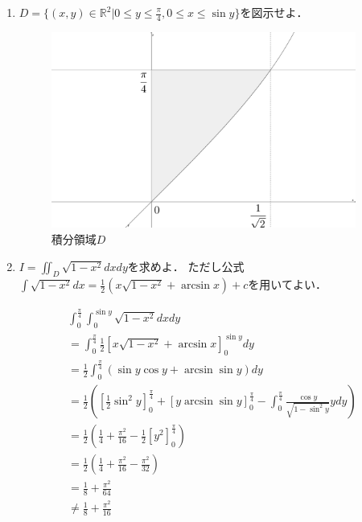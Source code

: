 \documentclass[a4paper,10pt]{jarticle}
\begin{document}
\begin{enumerate}
\item$D=\{(x,y)\in \mathbb{R}^2|0 \leq y \leq \frac{\pi}{4}, 0 \leq x \leq \sin{y}\}$を図示せよ．

\begin{figure}[H]
	\begin{center}
		\includegraphics[width=100mm,bb  = 0 0 300 200]{21.png}
	\end{center}
 	\caption{積分領域$D$}
\end{figure}

\item $I=\iint_{D} \sqrt{1-x^2} dxdy$を求めよ．
ただし公式$\int\sqrt{1-x^2}dx=\frac{1}{2}(x\sqrt{1-x^2}+\arcsin{x})+c$を用いてよい．
\begin{fleqn}[30pt] \begin{gather*}
	\int_0^{\frac{\pi}{4}} \int_{0}^{\sin{y}} \sqrt{1-x^2} dx dy\\
	=\int_0^{\frac{\pi}{4}} \frac{1}{2} \left[ x\sqrt{1-x^2} + \arcsin{x} \right]_{0}^{\sin{y}} dy\\
	=\frac{1}{2} \int_0^{\frac{\pi}{4}} ( \sin{y}\cos{y}+\arcsin{\sin{y}} ) dy\\
	=\frac{1}{2} \left( \left[ \frac{1}{2}\sin^2{y} \right]^{\frac{\pi}{4}}_0 + \left[ y \arcsin{\sin{y}} \right]^{\frac{\pi}{4}}_0 - \int_0^{\frac{\pi}{4}}\frac{\cos{y}}{\sqrt{1-\sin^2{y}}}ydy \right) \\
	=\frac{1}{2} \left( \frac{1}{4} + \frac{\pi^2}{16} - \frac{1}{2}\left[ y^2 \right]^{\frac{\pi}{4}}_0 \right) \\
	=\frac{1}{2} \left( \frac{1}{4} + \frac{\pi^2}{16} -\frac{\pi^2}{32} \right) \\
	=\frac{1}{8} + \frac{\pi^2}{64}\\
	\ne \frac{1}{8}+\frac{\pi^2}{16}
\end{gather*} \end{fleqn}
\end{enumerate}
\end{document}
